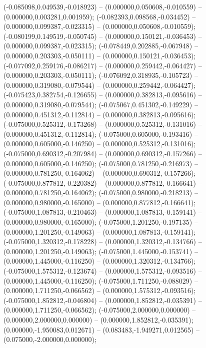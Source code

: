  (-0.085098,0.049539,-0.018923) -- (0.000000,0.050608,-0.010559) -- (0.000000,0.003281,0.001959);
 (-0.082393,0.098568,-0.034452) -- (0.000000,0.099387,-0.023315) -- (0.000000,0.050608,-0.010559);
 (-0.080199,0.149519,-0.050745) -- (0.000000,0.150121,-0.036453) -- (0.000000,0.099387,-0.023315);
 (-0.078449,0.202885,-0.067948) -- (0.000000,0.203303,-0.050111) -- (0.000000,0.150121,-0.036453);
 (-0.077092,0.259176,-0.086217) -- (0.000000,0.259442,-0.064427) -- (0.000000,0.203303,-0.050111);
 (-0.076092,0.318935,-0.105723) -- (0.000000,0.319080,-0.079544) -- (0.000000,0.259442,-0.064427);
 (-0.075423,0.382754,-0.126655) -- (0.000000,0.382813,-0.095616) -- (0.000000,0.319080,-0.079544);
 (-0.075067,0.451302,-0.149229) -- (0.000000,0.451312,-0.112814) -- (0.000000,0.382813,-0.095616);
 (-0.075000,0.525312,-0.173268) -- (0.000000,0.525312,-0.131016) -- (0.000000,0.451312,-0.112814);
 (-0.075000,0.605000,-0.193416) -- (0.000000,0.605000,-0.146250) -- (0.000000,0.525312,-0.131016);
 (-0.075000,0.690312,-0.207984) -- (0.000000,0.690312,-0.157266) -- (0.000000,0.605000,-0.146250);
 (-0.075000,0.781250,-0.216973) -- (0.000000,0.781250,-0.164062) -- (0.000000,0.690312,-0.157266);
 (-0.075000,0.877812,-0.220382) -- (0.000000,0.877812,-0.166641) -- (0.000000,0.781250,-0.164062);
 (-0.075000,0.980000,-0.218213) -- (0.000000,0.980000,-0.165000) -- (0.000000,0.877812,-0.166641);
 (-0.075000,1.087813,-0.210463) -- (0.000000,1.087813,-0.159141) -- (0.000000,0.980000,-0.165000);
 (-0.075000,1.201250,-0.197135) -- (0.000000,1.201250,-0.149063) -- (0.000000,1.087813,-0.159141);
 (-0.075000,1.320312,-0.178228) -- (0.000000,1.320312,-0.134766) -- (0.000000,1.201250,-0.149063);
 (-0.075000,1.445000,-0.153741) -- (0.000000,1.445000,-0.116250) -- (0.000000,1.320312,-0.134766);
 (-0.075000,1.575312,-0.123674) -- (0.000000,1.575312,-0.093516) -- (0.000000,1.445000,-0.116250);
 (-0.075000,1.711250,-0.088029) -- (0.000000,1.711250,-0.066562) -- (0.000000,1.575312,-0.093516);
 (-0.075000,1.852812,-0.046804) -- (0.000000,1.852812,-0.035391) -- (0.000000,1.711250,-0.066562);
 (-0.075000,2.000000,0.000000) -- (0.000000,2.000000,0.000000) -- (0.000000,1.852812,-0.035391);
 (0.000000,-1.950083,0.012671) -- (0.083483,-1.949271,0.012565) -- (0.075000,-2.000000,0.000000);
